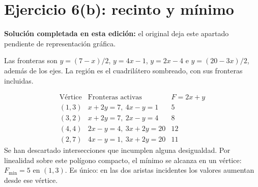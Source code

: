 \documentclass[11pt]{article}
\begin{document}
\section*{Ejercicio 6(b): recinto y mínimo}
\textbf{Solución completada en esta edición:} el original deja este apartado pendiente de representación gráfica.

Las fronteras son $y=(7-x)/2$, $y=4x-1$, $y=2x-4$ e $y=(20-3x)/2$, además de los ejes. La región es el cuadrilátero sombreado, con sus fronteras incluidas.
\begin{center}
\end{center}
\[
\begin{array}{c|c|c}
\text{Vértice}&\text{Fronteras activas}&F=2x+y\\\hline
(1,3)&x+2y=7,\ 4x-y=1&5\\
(3,2)&x+2y=7,\ 2x-y=4&8\\
(4,4)&2x-y=4,\ 3x+2y=20&12\\
(2,7)&4x-y=1,\ 3x+2y=20&11
\end{array}
\]
Se han descartado intersecciones que incumplen alguna desigualdad. Por linealidad sobre este polígono compacto, el mínimo se alcanza en un vértice: $\boxed{F_{\min}=5\text{ en }(1,3)}$. Es único: en las dos aristas incidentes los valores aumentan desde ese vértice.
\clearpage
\end{document}
